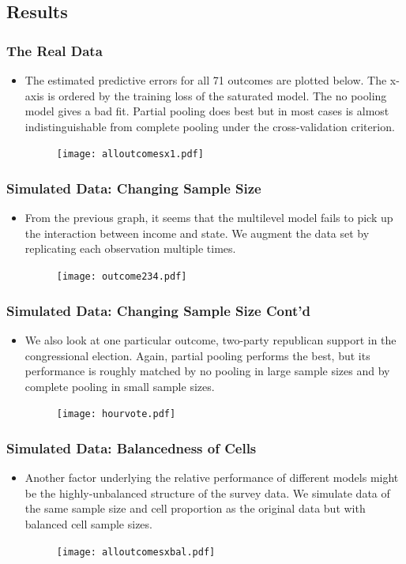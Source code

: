 \documentclass[xetex,mathserif,serif]{beamer}
\begin{document}
\subsection{Results}
\begin{frame}
  \frametitle{The Real Data}
  \begin{itemize}
  \item The estimated predictive errors for all 71 outcomes are plotted
    below. The x-axis is ordered by the training loss of the saturated model. The
    no pooling model gives a bad fit.  Partial pooling does best but in most
    cases is almost indistinguishable from complete pooling under the
    cross-validation criterion.
    \begin{figure}[htbp]
      \centering
      \texttt{[image: alloutcomesx1.pdf]}
    \end{figure}
  \end{itemize}
\end{frame}

\begin{frame}
  \frametitle{Simulated Data: Changing Sample Size}
  \begin{itemize}
  \item From the previous graph, it seems that the multilevel model fails to pick
    up the interaction between income and state. We augment the data set by
    replicating each observation multiple times. 
    \begin{figure}[htbp]
      \centering
      \texttt{[image: outcome234.pdf]}
    \end{figure}
  \end{itemize}
\end{frame}

\begin{frame}
  \frametitle{Simulated Data: Changing Sample Size Cont'd}
  \begin{itemize}
  \item We also look at one particular outcome, two-party republican support in
    the congressional election. Again, partial pooling performs the best, but its
    performance is roughly matched by no pooling in large sample sizes and by
    complete pooling in small sample sizes.
    \begin{figure}[htbp]
      \centering
      \texttt{[image: hourvote.pdf]}
    \end{figure}
  \end{itemize}
\end{frame}

\begin{frame}
  \frametitle{Simulated Data: Balancedness of Cells}
  \begin{itemize}
  \item Another factor underlying the relative performance of different models
    might be the highly-unbalanced structure of the survey data. We simulate data
    of the same sample size and cell proportion as the original data but with
    balanced cell sample sizes.
    \begin{figure}[htbp]
      \centering
      \texttt{[image: alloutcomesxbal.pdf]}
    \end{figure}
  \end{itemize}
\end{frame}
\end{document}
